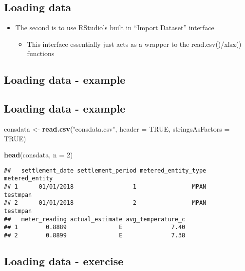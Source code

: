\documentclass[]{article}
\newenvironment{Shaded}{\begin{snugshade}}{\end{snugshade}}
\newcommand{\KeywordTok}[1]{\textcolor[rgb]{0.13,0.29,0.53}{\textbf{#1}}}
\newcommand{\DataTypeTok}[1]{\textcolor[rgb]{0.13,0.29,0.53}{#1}}
\newcommand{\DecValTok}[1]{\textcolor[rgb]{0.00,0.00,0.81}{#1}}
\newcommand{\StringTok}[1]{\textcolor[rgb]{0.31,0.60,0.02}{#1}}
\newcommand{\OtherTok}[1]{\textcolor[rgb]{0.56,0.35,0.01}{#1}}
\newcommand{\NormalTok}[1]{#1}
\providecommand{\tightlist}{%
  \setlength{\itemsep}{0pt}\setlength{\parskip}{0pt}}
\begin{document}
\subsection{Loading data}\label{loading-data-1}

\begin{itemize}
\tightlist
\item
  The second is to use RStudio's built in ``Import Dataset'' interface

  \begin{itemize}
  \tightlist
  \item
    This interface essentially just acts as a wrapper to the
    read.csv()/xlsx() functions
  \end{itemize}
\end{itemize}

\subsection{Loading data - example}\label{loading-data---example}

\subsection{Loading data - example}\label{loading-data---example-1}

\begin{Shaded}
\begin{Highlighting}[]
\NormalTok{consdata <-}\StringTok{ }\KeywordTok{read.csv}\NormalTok{(}\StringTok{"consdata.csv"}\NormalTok{, }\DataTypeTok{header =} \OtherTok{TRUE}\NormalTok{, }\DataTypeTok{stringsAsFactors =} \OtherTok{TRUE}\NormalTok{)}

\KeywordTok{head}\NormalTok{(consdata, }\DataTypeTok{n =} \DecValTok{2}\NormalTok{)}
\end{Highlighting}
\end{Shaded}

\begin{verbatim}
##   settlement_date settlement_period metered_entity_type metered_entity
## 1      01/01/2018                 1                MPAN       testmpan
## 2      01/01/2018                 2                MPAN       testmpan
##   meter_reading actual_estimate avg_temperature_c
## 1        0.8889               E              7.40
## 2        0.8899               E              7.38
\end{verbatim}

\subsection{Loading data - exercise}\label{loading-data---exercise}
\end{document}
